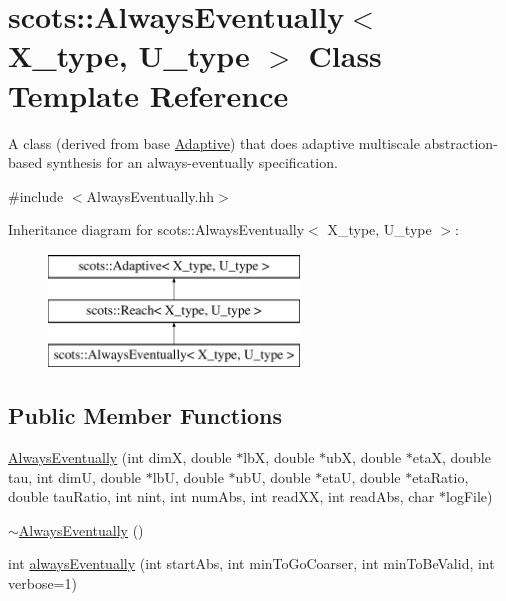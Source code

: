 \hypertarget{classscots_1_1AlwaysEventually}{}\section{scots\+:\+:Always\+Eventually$<$ X\+\_\+type, U\+\_\+type $>$ Class Template Reference}
\label{classscots_1_1AlwaysEventually}


A class (derived from base \hyperlink{classscots_1_1Adaptive}{Adaptive}) that does adaptive multiscale abstraction-\/based synthesis for an always-\/eventually specification.  




{\ttfamily \#include $<$Always\+Eventually.\+hh$>$}

Inheritance diagram for scots\+:\+:Always\+Eventually$<$ X\+\_\+type, U\+\_\+type $>$\+:\begin{figure}[H]
\begin{center}
\leavevmode
\includegraphics[height=3.000000cm]{classscots_1_1AlwaysEventually}
\end{center}
\end{figure}
\subsection*{Public Member Functions}
\begin{DoxyCompactItemize}
\item 
\hyperlink{classscots_1_1AlwaysEventually_a9a84a1c19b7ca2d26507247e47d3d95a}{Always\+Eventually} (int dimX, double $\ast$lbX, double $\ast$ubX, double $\ast$etaX, double tau, int dimU, double $\ast$lbU, double $\ast$ubU, double $\ast$etaU, double $\ast$eta\+Ratio, double tau\+Ratio, int nint, int num\+Abs, int read\+XX, int read\+Abs, char $\ast$log\+File)
\item 
\hyperlink{classscots_1_1AlwaysEventually_aa3d060f750bf82b5a41afdf7d925c3bb}{$\sim$\+Always\+Eventually} ()
\item 
int \hyperlink{classscots_1_1AlwaysEventually_a2428c979a09a3aa7efeed53059098bbc}{always\+Eventually} (int start\+Abs, int min\+To\+Go\+Coarser, int min\+To\+Be\+Valid, int verbose=1)
\end{DoxyCompactItemize}
